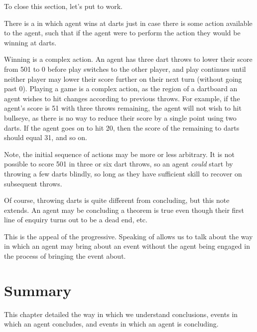 \begin{note}
  To close this section, let's put  to work.

  \begin{illustration}[Darts]
    There is a \pevent{} in which agent wins at darts just in case there is some action available to the agent, such that if the agent were to perform the action they would be winning at darts.

    Winning is a complex action.
  An agent has three dart throws to lower their score from 501 to 0 before play switches to the other player, and play continues until neither player may lower their score further on their next turn (without going past 0).
  Playing a game is a complex action, as the region of a dartboard an agent wishes to hit changes according to previous throws.
  For example, if the agent's score is 51 with three throws remaining, the agent will not wish to hit bullseye, as there is no way to reduce their score by a single point using two darts.
  If the agent goes on to hit 20, then the score of the remaining to darts should equal 31, and so on.
  \end{illustration}

  Note, the initial sequence of actions may be more or less arbitrary.
  It is not possible to score 501 in three or six dart throws, so an agent \emph{could} start by throwing a few darts blindly, so long as they have sufficient skill to recover on subsequent throws.

  Of course, throwing darts is quite different from concluding, but this note extends.
  An agent may be concluding a theorem is true even though their first line of enquiry turns out to be a dead end, etc.

  This is the appeal of the progressive.
  Speaking of  allows us to talk about the way in which an agent may bring about an event without the agent being engaged in the process of bringing the event about.
\end{note}

\newpage

\section{Summary}
\label{cha:clar:sec:sum}

\begin{note}
  This chapter detailed the way in which we understand conclusions, events in which an agent concludes, and events in which an agent is concluding.
\end{note}

